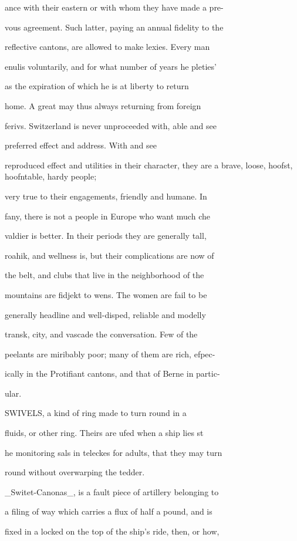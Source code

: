 \documentclass{article}
\begin{document}
ance with their eastern or with whom they have made a pre-

vous agreement. Such latter, paying an annual fidelity to the

reflective cantons, are allowed to make lexies. Every man

enulis voluntarily, and for what number of years he pleties'

as the expiration of which he is at liberty to return

home. A great may thus always returning from foreign

ferivs. Switzerland is never unproceeded with, able and see

preferred effect and address. With and see

reproduced effect and utilities in their character, they are a brave, loose, hoofst, hoofntable, hardy people;

very true to their engagements, friendly and humane. In

fany, there is not a people in Europe who want much che

valdier is better. In their periods they are generally tall,

roahik, and wellness is, but their complications are now of

the belt, and clubs that live in the neighborhood of the

mountains are fidjekt to wens. The women are fail to be

generally headline and well-disped, reliable and modelly

transk, city, and vascade the conversation. Few of the

peelants are miribably poor; many of them are rich, efpec-

ically in the Protifiant cantons, and that of Berne in partic-

ular.

SWIVELS, a kind of ring made to turn round in a

fluids, or other ring. Theirs are ufed when a ship lies st

he monitoring sals in teleckes for adults, that they may turn

round without overwarping the tedder.

\_Switet-Canonas\_, is a fault piece of artillery belonging to

a filing of way which carries a flux of half a pound, and is

fixed in a locked on the top of the ship's ride, then, or how,
\end{document}
